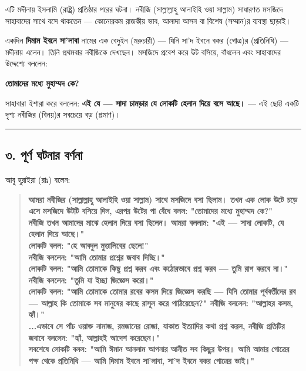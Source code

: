 এটি মদীনায় ইসলামি  (রাষ্ট্র) প্রতিষ্ঠার পরের ঘটনা। নবীজি (সাল্লাল্লাহু আলাইহি ওয়া সাল্লাম) সাধারণত মসজিদে সাহাবাদের সাথে বসে থাকতেন — কোনোরকম রাজকীয় ভাব, আলাদা আসন বা বিশেষ  (সম্মান)র ব্যবস্থা ছাড়াই।

একদিন \textbf{দিমাম ইবনে সা'লাবা} নামের এক বেদুইন (মরুচারী) — যিনি সা'দ ইবনে বকর  (গোত্র)র  (প্রতিনিধি) — মদীনায় এলেন। তিনি প্রথমবার নবীজিকে দেখছেন। মসজিদে প্রবেশ করে উট বসিয়ে, বাঁধলেন এবং সাহাবাদের উদ্দেশ্যে বললেন:

\textbf{তোমাদের মধ্যে মুহাম্মদ কে?}

সাহাবারা ইশারা করে বললেন: \textbf{এই যে — সাদা চামড়ার যে লোকটি হেলান দিয়ে বসে আছে।} — এই ছোট্ট একটি দৃশ্য নবীজির  (বিনয়)র সবচেয়ে বড়  (প্রমাণ)।

\medskip\hrule\medskip

\subsection*{৩. পূর্ণ ঘটনার বর্ণনা}

আবু হুরাইরা (রাঃ) বলেন:

\begin{quote}
\textbf{আমরা নবীজির (সাল্লাল্লাহু আলাইহি ওয়া সাল্লাম) সাথে মসজিদে বসা ছিলাম। তখন এক লোক উটে চড়ে এসে মসজিদে উটটি বসিয়ে দিল, এরপর উটের পা বেঁধে বলল: "তোমাদের মধ্যে মুহাম্মদ কে?"} \\
\textbf{নবীজি তখন আমাদের মাঝে হেলান দিয়ে বসা ছিলেন। আমরা বললাম: "এই — সাদা লোকটি, যে হেলান দিয়ে আছে।"} \\
\textbf{লোকটি বলল: "হে আবদুল মুত্তালিবের ছেলে!"} \\
\textbf{নবীজি বললেন: "আমি তোমার প্রশ্নের জবাব দিচ্ছি।"} \\
\textbf{লোকটি বলল: "আমি তোমাকে কিছু প্রশ্ন করব এবং কঠোরভাবে প্রশ্ন করব — তুমি রাগ করবে না।"} \\
\textbf{নবীজি বললেন: "তুমি যা ইচ্ছা জিজ্ঞেস করো।"} \\
\textbf{লোকটি বলল: "আমি তোমাকে তোমার রবের কসম দিয়ে জিজ্ঞেস করছি — যিনি তোমার পূর্ববর্তীদের রব — আল্লাহ কি তোমাকে সব মানুষের কাছে রাসূল করে পাঠিয়েছেন?" নবীজি বললেন: "আল্লাহর কসম, হ্যাঁ।"} \\
\textbf{...এভাবে সে পাঁচ ওয়াক্ত নামাজ, রমজানের রোজা, যাকাত ইত্যাদির কথা প্রশ্ন করল, নবীজি প্রতিটির জবাবে বললেন: "হ্যাঁ, আল্লাহই আদেশ করেছেন।"} \\
\textbf{সবশেষে লোকটি বলল: "আমি ঈমান আনলাম আপনার আনীত সব কিছুর উপর। আমি আমার গোত্রের পক্ষ থেকে প্রতিনিধি — আমি দিমাম ইবনে সা'লাবা, সা'দ ইবনে বকর গোত্রের ভাই।"}
\end{quote}

